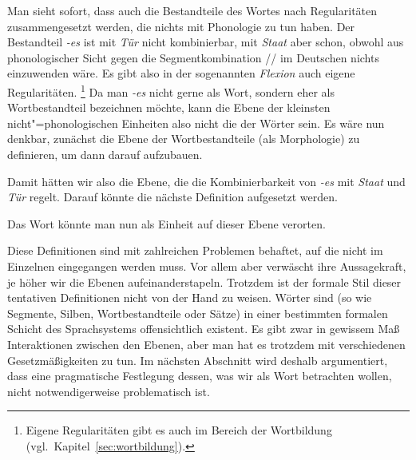 \begin{exe}
  \ex
  \begin{xlist}
  \end{xlist}
\end{exe}

Man sieht sofort, dass auch die Bestandteile des Wortes nach Regularitäten zusammengesetzt werden, die nichts mit Phonologie zu tun haben.
Der Bestandteil \textit{-es} ist mit \textit{Tür} nicht kombinierbar, mit \textit{Staat} aber schon, obwohl aus phonologischer Sicht gegen die Segmentkombination // im Deutschen nichts einzuwenden wäre.
Es gibt also in der sogenannten \textit{Flexion} auch eigene Regularitäten.%
\footnote{Eigene Regularitäten gibt es auch im Bereich der Wortbildung (vgl.\ Kapitel~\ref{sec:wortbildung}).}
\label{arbref:9234645}Da man \textit{-es} nicht gerne als Wort, sondern eher als Wortbestandteil bezeichnen möchte, kann die Ebene der kleinsten nicht"=phonologischen Einheiten also nicht die der Wörter sein.
Es wäre nun denkbar, zunächst die Ebene der Wortbestandteile (als Morphologie) zu definieren, um dann darauf aufzubauen.


Damit hätten wir also die Ebene, die die Kombinierbarkeit von \textit{-es} mit \textit{Staat} und \textit{Tür} regelt.
Darauf könnte die nächste Definition aufgesetzt werden.


Das Wort könnte man nun als Einheit auf dieser Ebene verorten.


Diese Definitionen sind mit zahlreichen Problemen behaftet, auf die nicht im Einzelnen eingegangen werden muss.
Vor allem aber verwäscht ihre Aussagekraft, je höher wir die Ebenen aufeinanderstapeln.
Trotzdem ist der formale Stil dieser tentativen Definitionen nicht von der Hand zu weisen.
Wörter sind (so wie Segmente, Silben, Wortbestandteile oder Sätze) in einer bestimmten formalen Schicht des Sprachsystems offensichtlich existent.
Es gibt zwar in gewissem Maß Interaktionen zwischen den Ebenen, aber man hat es trotzdem mit verschiedenen Gesetzmäßigkeiten zu tun.
Im nächsten Abschnitt wird deshalb argumentiert, dass eine pragmatische Festlegung dessen, was wir als Wort betrachten wollen, nicht notwendigerweise problematisch ist.

